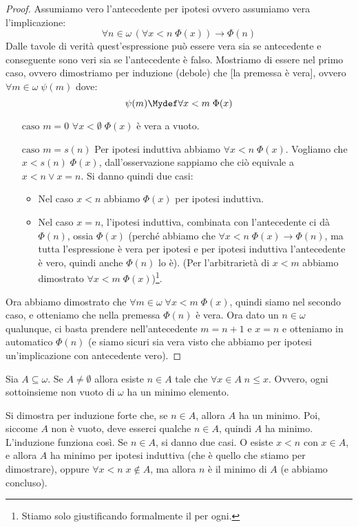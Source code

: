 \documentclass[11pt]{scrartcl}
\begin{document}
\begin{proof}
	Assumiamo vero l'antecedente per ipotesi ovvero assumiamo vera l'implicazione:
	\[ \forall n \in \omega \, (\forall x < n \; \Phi(x)) \rightarrow \Phi(n)
		\]
	Dalle tavole di verità quest'espressione può essere vera sia se antecedente e conseguente sono veri sia se l'antecedente è falso. Mostriamo di essere nel primo caso,
	ovvero dimostriamo per induzione (debole) che [la premessa è vera], ovvero $\forall m \in \omega \; \psi(m)$ dove:
	\[ \psi(m) \Mydef \forall x < m \; \Phi(x)
		\]
	\begin{itemize}
		\item[$\boxed{\text{caso $m = 0$}}$] $\forall x < \emptyset \; \Phi(x)$ è vera a vuoto.
		\item[$\boxed{\text{caso $m = s(n)$}}$] Per ipotesi induttiva abbiamo $\forall x < n \; \Phi(x).$ Vogliamo che $x < s(n) \;\Phi(x)$, dall'osservazione sappiamo che ciò equivale a $x < n \lor x = n$.
		Si danno quindi due casi:
		\begin{itemize}
			\item Nel caso $x < n$ abbiamo $\Phi(x)$ per ipotesi induttiva.
			\item Nel caso $x = n$, l'ipotesi induttiva, combinata con l'antecedente ci dà $\Phi(n)$, ossia $\Phi(x)$ (perché abbiamo che $\forall x < n \;\Phi(x) \rightarrow \Phi(n)$, ma tutta l'espressione è vera per ipotesi e per ipotesi induttiva l'antecedente è vero, quindi anche $\Phi(n)$ lo è).
			(Per l'arbitrarietà di $x<m$ abbiamo dimostrato $\forall x < m \; \Phi(x)$)\footnote{Stiamo solo giustificando formalmente il per ogni.}.
		\end{itemize}
	\end{itemize}
	Ora abbiamo dimostrato che $\forall m \in \omega \; \forall x < m \; \Phi(x)$, quindi siamo nel secondo caso, e otteniamo che nella premessa $\Phi(n)$ è vera. Ora dato un $n \in \omega$ qualunque, ci basta prendere nell'antecedente $m = n + 1$ e $x = n$ e otteniamo in automatico $\Phi(n)$ (e siamo sicuri sia vera 
	visto che abbiamo per ipotesi un'implicazione con antecedente vero).
\end{proof}

\begin{theorem}
	Sia $A \subseteq \omega$. Se $A \ne \emptyset$ allora esiste $n \in A$ tale che $\forall x \in A \; n \leq x$. Ovvero, ogni sottoinsieme non vuoto di $\omega$ ha un minimo elemento.
\end{theorem}

\begin{remark}
	 Si dimostra per induzione forte che, se $n \in A$, allora $A$ ha un minimo. Poi, siccome $A$ non è vuoto, deve esserci qualche $n \in A$, quindi $A$ ha minimo. L'induzione 
	funziona così. Se $n \in A$, si danno due casi. O esiste $x < n$ con $x \in A$, e allora $A$ ha minimo per ipotesi induttiva (che è quello che stiamo per dimostrare), oppure $\forall x < n \; x \not\in A$, ma allora $n$ è il minimo di $A$ (e abbiamo concluso).
\end{remark}
\end{document}
